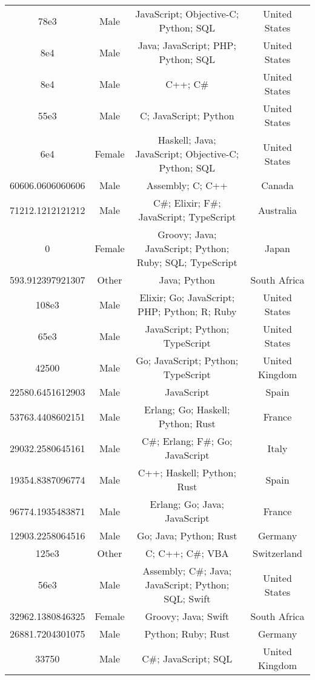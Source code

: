 \begin{center}
\begin{tabular}{ |c|c|c|c| }
78e3  &  Male  &  JavaScript; Objective-C; Python; SQL  &  United States  \\ 
8e4  &  Male  &  Java; JavaScript; PHP; Python; SQL  &  United States  \\ 
8e4  &  Male  &  C++; C\#  &  United States  \\ 
55e3  &  Male  &  C; JavaScript; Python  &  United States  \\ 
6e4  &  Female  &  Haskell; Java; JavaScript; Objective-C; Python; SQL  &  United States  \\ 
60606.0606060606  &  Male  &  Assembly; C; C++  &  Canada  \\ 
71212.1212121212  &  Male  &  C\#; Elixir; F\#; JavaScript; TypeScript  &  Australia  \\ 
0  &  Female  &  Groovy; Java; JavaScript; Python; Ruby; SQL; TypeScript  &  Japan  \\ 
593.912397921307  &  Other  &  Java; Python  &  South Africa  \\ 
108e3  &  Male  &  Elixir; Go; JavaScript; PHP; Python; R; Ruby  &  United States  \\ 
65e3  &  Male  &  JavaScript; Python; TypeScript  &  United States  \\ 
42500  &  Male  &  Go; JavaScript; Python; TypeScript  &  United Kingdom  \\ 
22580.6451612903  &  Male  &  JavaScript  &  Spain  \\ 
53763.4408602151  &  Male  &  Erlang; Go; Haskell; Python; Rust  &  France  \\ 
29032.2580645161  &  Male  &  C\#; Erlang; F\#; Go; JavaScript  &  Italy  \\ 
19354.8387096774  &  Male  &  C++; Haskell; Python; Rust  &  Spain  \\ 
96774.1935483871  &  Male  &  Erlang; Go; Java; JavaScript  &  France  \\ 
12903.2258064516  &  Male  &  Go; Java; Python; Rust  &  Germany  \\ 
125e3  &  Other  &  C; C++; C\#; VBA  &  Switzerland  \\ 
56e3  &  Male  &  Assembly; C\#; Java; JavaScript; Python; SQL; Swift  &  United States  \\ 
32962.1380846325  &  Female  &  Groovy; Java; Swift  &  South Africa  \\ 
26881.7204301075  &  Male  &  Python; Ruby; Rust  &  Germany  \\ 
33750  &  Male  &  C\#; JavaScript; SQL  &  United Kingdom  \\ 

\end{tabular}
\end{center}
